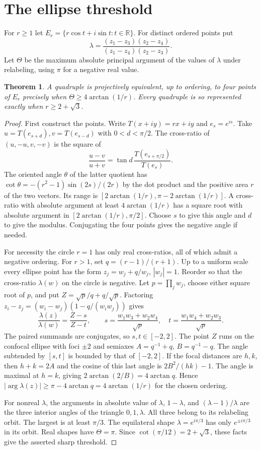 \documentclass[11pt]{article}
\newtheorem{theorem}{Theorem}
\begin{document}
\section*{The ellipse threshold}
For $r\ge1$ let $E_r=\{r\cos t+i\sin t:t\in\mathbb R\}$.
For distinct ordered points put
\[
 \lambda=\frac{(z_1-z_3)(z_2-z_4)}{(z_1-z_4)(z_2-z_3)}.
\]
Let $\Theta$ be the maximum absolute principal argument of the values of
$\lambda$ under relabeling, using $\pi$ for a negative real value.
\begin{theorem}
A quadruple is projectively equivalent, up to ordering, to four points of
$E_r$ precisely when $\Theta\ge4\arctan(1/r)$. Every quadruple is so
represented exactly when $r\ge 2+\sqrt3$.
\end{theorem}
\begin{proof}
First construct the points. Write $T(x+iy)=rx+iy$ and $e_s=e^{is}$.
Take $u=T(e_{s+d}), v=T(e_{s-d})$ with $0<d<\pi/2$. The
cross-ratio of $(u,-u,v,-v)$ is the square of
\[
 \frac{u-v}{u+v}=\tan d\,\frac{T(e_{s+\pi/2})}{T(e_s)} .
\]
The oriented angle $\theta$ of the latter quotient has
$\cot\theta=-(r^2-1)\sin(2s)/(2r)$ by the dot product and the
positive area $r$ of the two vectors. Its range is
$[2\arctan(1/r),\pi-2\arctan(1/r)]$. A cross-ratio with absolute
argument at least $4\arctan(1/r)$ has a square root with absolute
argument in $[2\arctan(1/r),\pi/2]$. Choose $s$ to give this
angle and $d$ to give the modulus. Conjugating the four points gives
the negative angle if needed.

For necessity the circle $r=1$ has only real cross-ratios, all of
which admit a negative ordering. For $r>1$, set $q=(r-1)/(r+1)$.
Up to a uniform scale every ellipse point has the form
$z_j=w_j+q/w_j$, $|w_j|=1$. Reorder so that the cross-ratio
$\lambda(w)$ on the circle is negative. Let $p=\prod_jw_j$,
choose either square root of $p$, and put $Z=\sqrt p/q+q/\sqrt p$.
Factoring $z_i-z_j=(w_i-w_j)(1-q/(w_iw_j))$ gives
\[
 \frac{\lambda(z)}{\lambda(w)}=\frac{Z-s}{Z-t},\qquad
 s=\frac{w_1w_3+w_2w_4}{\sqrt p},\quad
 t=\frac{w_1w_4+w_2w_3}{\sqrt p}.
\]
The paired summands are conjugates, so $s,t\in[-2,2]$.
The point $Z$ runs on the confocal ellipse with foci $\pm2$ and
semiaxes $A=q^{-1}+q$, $B=q^{-1}-q$. The angle subtended by
$[s,t]$ is bounded by that of $[-2,2]$. If the focal distances are
$h,k$, then $h+k=2A$ and the cosine of this last angle is
$2B^2/(hk)-1$. The angle is maximal at $h=k$, giving
$2\arctan(2/B)=4\arctan q$. Hence $|\arg\lambda(z)|\ge
\pi-4\arctan q=4\arctan(1/r)$ for the chosen ordering.

For nonreal $\lambda$, the arguments in absolute value of $\lambda$,
$1-\lambda$, and $(\lambda-1)/\lambda$ are the three interior angles of
the triangle $0,1,\lambda$. All three belong to its relabeling orbit.
The largest is at least $\pi/3$. The equilateral shape
$\lambda=e^{i\pi/3}$ has only $e^{\pm i\pi/3}$ in its orbit.
Real shapes have $\Theta=\pi$. Since $\cot(\pi/12)=2+\sqrt3$,
these facts give the asserted sharp threshold.
\end{proof}
\end{document}
